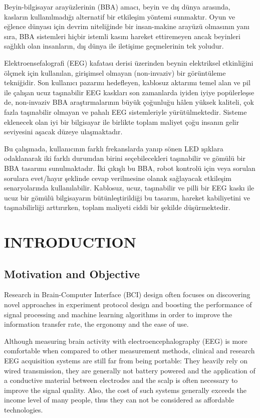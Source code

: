 \documentclass[12pt]{article}
\newcommand\mysection[1]{\vspace*{-0.35cm}\section{#1}\vspace*{6pt}\thispagestyle{empty}}
\newcommand\mysubsection[1]{\subsection{#1}}
\numberwithin{equation}{section}
\numberwithin{figure}{section}
\numberwithin{table}{section}
\begin{document}
\par{
    Beyin-bilgisayar arayüzlerinin (BBA) amacı, beyin ve dış dünya arasında, kasların
    kullanılmadığı alternatif bir etkileşim yöntemi sunmaktır. Oyun ve eğlence dünyası için devrim niteliğinde
    bir insan-makine arayüzü olmasının yanı sıra, BBA sistemleri hiçbir istemli kasını
    hareket ettiremeyen ancak beyinleri sağlıklı olan insanların, dış dünya ile iletişime geçmelerinin
    tek yoludur.
}
\par{
    Elektroensefalografi (EEG) kafatası derisi üzerinden beynin elektriksel
    etkinliğini ölçmek için kullanılan, girişimsel olmayan (non-invaziv) bir
    görüntüleme tekniğidir. Son kullanıcı pazarını hedefleyen,
    kablosuz aktarımı temel alan ve pil ile çalışan ucuz taşınabilir EEG kaskları son
    zamanlarda iyiden iyiye popülerleşse de, non-invaziv BBA araştırmalarının
    büyük çoğunluğu hâlen yüksek kaliteli, çok fazla taşınabilir olmayan
    ve pahalı EEG sistemleriyle yürütülmektedir. Sisteme eklenecek olan
    iyi bir bilgisayar ile birlikte toplam maliyet çoğu insanın gelir seviyesini
    aşacak düzeye ulaşmaktadır.
}
\par{
    Bu çalışmada, kullanıcının farklı frekanslarda yanıp sönen LED ışıklara
    odaklanarak iki farklı durumdan birini seçebilecekleri taşınabilir ve gömülü
    bir BBA tasarımı sunulmaktadır. İki çıkışlı bu BBA, robot kontrolü için veya
    sorulan sorulara evet/hayır şeklinde cevap verilmesine olanak sağlayacak
    etkileşim senaryolarında kullanılabilir. Kablosuz, ucuz, taşınabilir ve pilli bir EEG
    kaskı ile ucuz bir gömülü bilgisayarın bütünleştirildiği bu tasarım,
    hareket kabiliyetini ve taşınabilirliği arttırırken, toplam maliyeti
    ciddi bir şekilde düşürmektedir.
}
\clearpage

\mysection{INTRODUCTION}
\thispagestyle{fancy}
\cfoot{}

\mysubsection{Motivation and Objective}
\par{
    Research in Brain-Computer Interface (BCI) design often focuses
    on discovering novel approaches in experiment protocol design and
    boosting the performance of signal processing and machine learning algorithms
    in order to improve the information transfer rate, the ergonomy and the
    ease of use.
}

\par{
    Although measuring brain activity with electroencephalography (EEG) is more
    comfortable when compared to other measurement methods, clinical and research
    EEG acquisition systems are still far from being portable: They heavily
    rely on wired transmission, they are generally not battery powered and
    the application of a conductive material between electrodes and the scalp is
    often necessary to improve the signal quality. Also, the cost of such systems
    generally exceeds the income level of many people, thus they can not be
    considered as affordable technologies.
}
\end{document}
